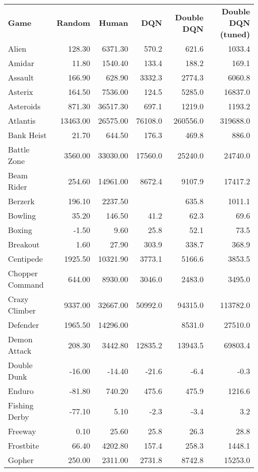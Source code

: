 \documentclass[letterpaper]{article}
\begin{document}
\begin{table*}[h]
\centering
\begin{tabular}{lrrrrr}
\textbf{Game} & \textbf{Random} & \textbf{Human} & \textbf{DQN} & \textbf{Double DQN}  & \textbf{Double DQN (tuned)} \\
Alien & 128.30 & 6371.30 & 570.2 & 621.6 & 1033.4 \\
Amidar & 11.80 & 1540.40 & 133.4 & 188.2 & 169.1 \\
Assault & 166.90 & 628.90 & 3332.3 & 2774.3 & 6060.8 \\
Asterix & 164.50 & 7536.00 & 124.5 & 5285.0 & 16837.0 \\
Asteroids & 871.30 & 36517.30 & 697.1 & 1219.0 & 1193.2 \\
Atlantis & 13463.00 & 26575.00 & 76108.0 & 260556.0 & 319688.0 \\
Bank Heist & 21.70 & 644.50 & 176.3 & 469.8 & 886.0 \\
Battle Zone & 3560.00 & 33030.00 & 17560.0 & 25240.0 & 24740.0 \\
Beam Rider & 254.60 & 14961.00 & 8672.4 & 9107.9 & 17417.2 \\
Berzerk & 196.10 & 2237.50 &  & 635.8 & 1011.1 \\
Bowling & 35.20 & 146.50 & 41.2 & 62.3 & 69.6 \\
Boxing & -1.50 & 9.60 & 25.8 & 52.1 & 73.5 \\
Breakout & 1.60 & 27.90 & 303.9 & 338.7 & 368.9 \\
Centipede & 1925.50 & 10321.90 & 3773.1 & 5166.6 & 3853.5 \\
Chopper Command & 644.00 & 8930.00 & 3046.0 & 2483.0 & 3495.0 \\
Crazy Climber & 9337.00 & 32667.00 & 50992.0 & 94315.0 & 113782.0 \\
Defender & 1965.50 & 14296.00 &  & 8531.0 & 27510.0 \\
Demon Attack & 208.30 & 3442.80 & 12835.2 & 13943.5 & 69803.4 \\
Double Dunk & -16.00 & -14.40 & -21.6 & -6.4 & -0.3 \\
Enduro & -81.80 & 740.20 & 475.6 & 475.9 & 1216.6 \\
Fishing Derby & -77.10 & 5.10 & -2.3 & -3.4 & 3.2 \\
Freeway & 0.10 & 25.60 & 25.8 & 26.3 & 28.8 \\
Frostbite & 66.40 & 4202.80 & 157.4 & 258.3 & 1448.1 \\
Gopher & 250.00 & 2311.00 & 2731.8 & 8742.8 & 15253.0 \\

\end{tabular}
\end{table*}
\end{document}
